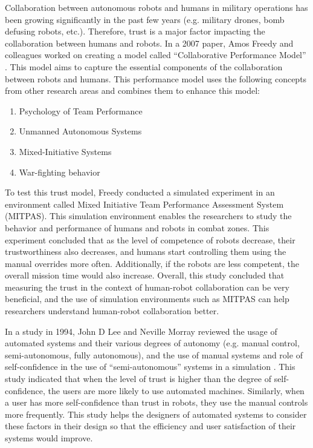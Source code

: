 \documentclass[runningheads,a4paper]{llncs}
\begin{document}
Collaboration between autonomous robots and humans in military operations has been growing significantly in the past few years (e.g. military drones, bomb defusing robots,  etc.). Therefore, trust is a major factor impacting the collaboration between humans and robots. In a 2007 paper, Amos Freedy and colleagues worked on creating a model called ``Collaborative Performance Model'' \cite{freedy2007measurement}. This model aims to capture the essential components of the collaboration between robots and humans. This performance model uses the following concepts from other research areas and combines them to enhance this model:
\begin{enumerate}
	\item Psychology of Team Performance
	\item Unmanned Autonomous Systems
	\item Mixed-Initiative Systems
	\item War-fighting behavior
\end{enumerate}

To test this trust model, Freedy conducted a simulated experiment in an environment called Mixed Initiative Team Performance Assessment System (MITPAS). This simulation environment enables the researchers to study the behavior and performance of humans and robots in combat zones. This experiment concluded that as the level of competence of robots decrease, their trustworthiness also decreases, and humans start controlling them using the manual overrides more often. Additionally, if the robots are less competent, the overall mission time would also increase. Overall, this study concluded that measuring the trust in the context of human-robot collaboration can be very beneficial, and the use of simulation environments such as MITPAS can help researchers understand human-robot collaboration better.

In a study in 1994, John D Lee and Neville Morray reviewed the usage of automated systems and their various degrees of autonomy (e.g. manual control, semi-autonomous, fully autonomous), and the use of manual systems and role of self-confidence in the use of ``semi-autonomous'' systems in a simulation \cite{lee1994trust}. This study indicated that when the level of trust is higher than the degree of self-confidence, the users are more likely to use automated machines. Similarly, when a user has more self-confidence than trust in robots, they use the manual controls more frequently. This study helps the designers of automated systems to consider these factors in their design so that the efficiency and user satisfaction of their systems would improve.
\end{document}
